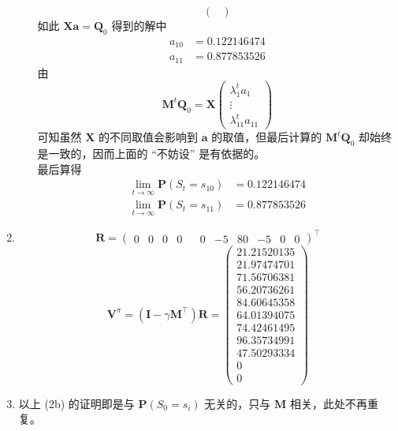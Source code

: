 \documentclass[11pt,letter,notitlepage]{article}
\begin{document}
\begin{solution}
\begin{enumerate}
\begin{enumerate}
$$\begin{pmatrix}
				            \end{pmatrix}$$
			            如此 $\mathbf{X}\mathbf{a}=\mathbf{Q}_0$ 得到的解中
			            $$\begin{aligned}
					            a_{10} & =0.122146474 \\
					            a_{11} & =0.877853526
				            \end{aligned}$$
			            由
			            $$\mathbf{M}^t \mathbf{Q}_0=\mathbf{X}\begin{pmatrix}
					            \lambda_1^t a_1 \\ \vdots \\ \lambda_{11}^t a_{11}
				            \end{pmatrix}$$
			            可知虽然 $\mathbf{X}$ 的不同取值会影响到 $\mathbf{a}$ 的取值，但最后计算的 $\mathbf{M}^t \mathbf{Q}_0$ 却始终是一致的，因而上面的 “不妨设” 是有依据的。\\
			            最后算得
			            $$\begin{aligned}
					            \lim_{t\rightarrow\infty}\mathbf{P}(S_t=s_{10}) & = 0.122146474 \\
					            \lim_{t\rightarrow\infty}\mathbf{P}(S_t=s_{11}) & = 0.877853526
				            \end{aligned}$$
		      \end{enumerate}
		\item $$\mathbf{R}=\begin{pmatrix}
				      0 & 0 & 0 & 0 &  & 0 & -5 & 80 & -5 & 0 & 0
			      \end{pmatrix}^\top$$
		      $$\mathbf{V}^\pi
			      =(\mathbf{I}-\gamma \mathbf{M}^\top) \mathbf{R}
			      =\begin{pmatrix}
				      21.21520135 \\
				      21.97474701 \\
				      71.56706381 \\
				      56.20736261 \\
				      84.60645358 \\
				      64.01394075 \\
				      74.42461495 \\
				      96.35734991 \\
				      47.50293334 \\
				      0           \\
				      0
			      \end{pmatrix}
		      $$
		\item 以上 (2b) 的证明即是与 $\mathbf{P}(S_0=s_i)$ 无关的，只与 $\mathbf{M}$ 相关，此处不再重复。
	\end{enumerate}
\end{solution}
\end{document}
